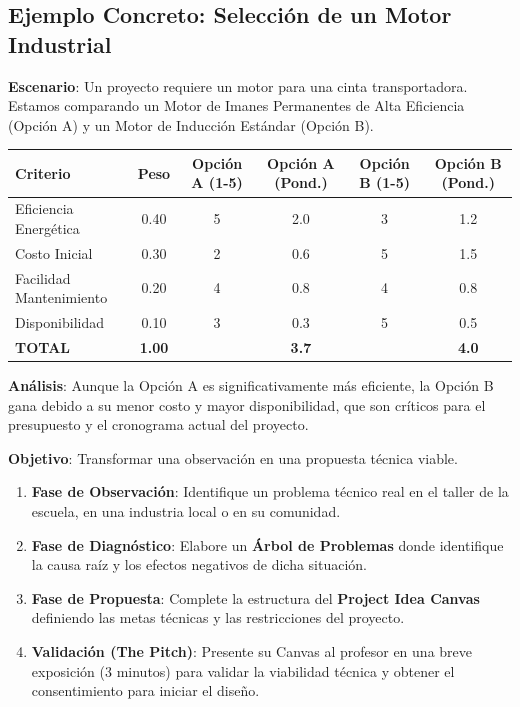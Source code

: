 \documentclass[../main]{subfiles}
\begin{document}
\subsection{Ejemplo Concreto: Selección de un Motor Industrial}
\textbf{Escenario}: Un proyecto requiere un motor para una cinta transportadora. Estamos comparando un Motor de Imanes Permanentes de Alta Eficiencia (Opción A) y un Motor de Inducción Estándar (Opción B).

\begin{center}
\begin{tabular}{|l|c|c|c|c|c|}
\hline
\textbf{Criterio} & \textbf{Peso} & \textbf{Opción A (1-5)} & \textbf{Opción A (Pond.)} & \textbf{Opción B (1-5)} & \textbf{Opción B (Pond.)} \\ \hline
Eficiencia Energética & 0.40 & 5 & 2.0 & 3 & 1.2 \\ \hline
Costo Inicial & 0.30 & 2 & 0.6 & 5 & 1.5 \\ \hline
Facilidad Mantenimiento & 0.20 & 4 & 0.8 & 4 & 0.8 \\ \hline
Disponibilidad & 0.10 & 3 & 0.3 & 5 & 0.5 \\ \hline
\textbf{TOTAL} & \textbf{1.00} & & \textbf{3.7} & & \textbf{4.0} \\ \hline
\end{tabular}
\end{center}

\textbf{Análisis}: Aunque la Opción A es significativamente más eficiente, la Opción B gana debido a su menor costo y mayor disponibilidad, que son críticos para el presupuesto y el cronograma actual del proyecto.

\newpage
{}

\textbf{Objetivo}: Transformar una observación en una propuesta técnica viable.

\begin{enumerate}
  \item \textbf{Fase de Observación}: Identifique un problema técnico real en el taller de la escuela, en una industria local o en su comunidad.
  \item \textbf{Fase de Diagnóstico}: Elabore un \textbf{Árbol de Problemas} donde identifique la causa raíz y los efectos negativos de dicha situación.
  \item \textbf{Fase de Propuesta}: Complete la estructura del \textbf{Project Idea Canvas} definiendo las metas técnicas y las restricciones del proyecto.
  \item \textbf{Validación (The Pitch)}: Presente su Canvas al profesor en una breve exposición (3 minutos) para validar la viabilidad técnica y obtener el consentimiento para iniciar el diseño.
\end{enumerate}
\end{document}
